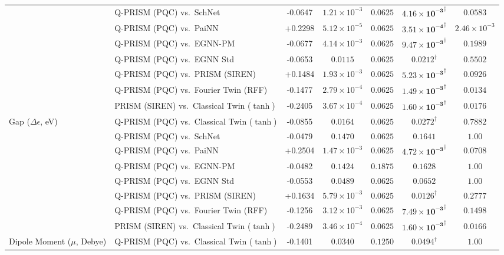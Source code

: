 \begin{table}[p]
{\begin{tabular}{llccccc}
 & Q-PRISM (PQC) vs.\ SchNet & -0.0647 & $1.21 \times 10^{-3}$ & $0.0625$ & $\mathbf{4.16 \times 10^{-3}}^{\dagger}$ & $0.0583$ \\
 & Q-PRISM (PQC) vs.\ PaiNN & +0.2298 & $5.12 \times 10^{-5}$ & $0.0625$ & $\mathbf{3.51 \times 10^{-4}}^{\dagger}$ & $2.46 \times 10^{-3}$ \\
 & Q-PRISM (PQC) vs.\ EGNN-PM & -0.0677 & $4.14 \times 10^{-3}$ & $0.0625$ & $\mathbf{9.47 \times 10^{-3}}^{\dagger}$ & $0.1989$ \\
 & Q-PRISM (PQC) vs.\ EGNN Std & -0.0653 & $0.0115$ & $0.0625$ & $\mathbf{0.0212}^{\dagger}$ & $0.5502$ \\
 & Q-PRISM (PQC) vs.\ PRISM (SIREN) & +0.1484 & $1.93 \times 10^{-3}$ & $0.0625$ & $\mathbf{5.23 \times 10^{-3}}^{\dagger}$ & $0.0926$ \\
 & Q-PRISM (PQC) vs.\ Fourier Twin (RFF) & -0.1477 & $2.79 \times 10^{-4}$ & $0.0625$ & $\mathbf{1.49 \times 10^{-3}}^{\dagger}$ & $0.0134$ \\
 & PRISM (SIREN) vs.\ Classical Twin ($\tanh$) & -0.2405 & $3.67 \times 10^{-4}$ & $0.0625$ & $\mathbf{1.60 \times 10^{-3}}^{\dagger}$ & $0.0176$ \\
\midrule
Gap ($\Delta\epsilon$, eV) & Q-PRISM (PQC) vs.\ Classical Twin ($\tanh$) & -0.0855 & $0.0164$ & $0.0625$ & $\mathbf{0.0272}^{\dagger}$ & $0.7882$ \\
 & Q-PRISM (PQC) vs.\ SchNet & -0.0479 & $0.1470$ & $0.0625$ & $0.1641$ & $1.00$ \\
 & Q-PRISM (PQC) vs.\ PaiNN & +0.2504 & $1.47 \times 10^{-3}$ & $0.0625$ & $\mathbf{4.72 \times 10^{-3}}^{\dagger}$ & $0.0708$ \\
 & Q-PRISM (PQC) vs.\ EGNN-PM & -0.0482 & $0.1424$ & $0.1875$ & $0.1628$ & $1.00$ \\
 & Q-PRISM (PQC) vs.\ EGNN Std & -0.0553 & $0.0489$ & $0.0625$ & $0.0652$ & $1.00$ \\
 & Q-PRISM (PQC) vs.\ PRISM (SIREN) & +0.1634 & $5.79 \times 10^{-3}$ & $0.0625$ & $\mathbf{0.0126}^{\dagger}$ & $0.2777$ \\
 & Q-PRISM (PQC) vs.\ Fourier Twin (RFF) & -0.1256 & $3.12 \times 10^{-3}$ & $0.0625$ & $\mathbf{7.49 \times 10^{-3}}^{\dagger}$ & $0.1498$ \\
 & PRISM (SIREN) vs.\ Classical Twin ($\tanh$) & -0.2489 & $3.46 \times 10^{-4}$ & $0.0625$ & $\mathbf{1.60 \times 10^{-3}}^{\dagger}$ & $0.0166$ \\
\midrule
Dipole Moment ($\mu$, Debye) & Q-PRISM (PQC) vs.\ Classical Twin ($\tanh$) & -0.1401 & $0.0340$ & $0.1250$ & $\mathbf{0.0494}^{\dagger}$ & $1.00$ \\

\end{tabular}}
\end{table}
